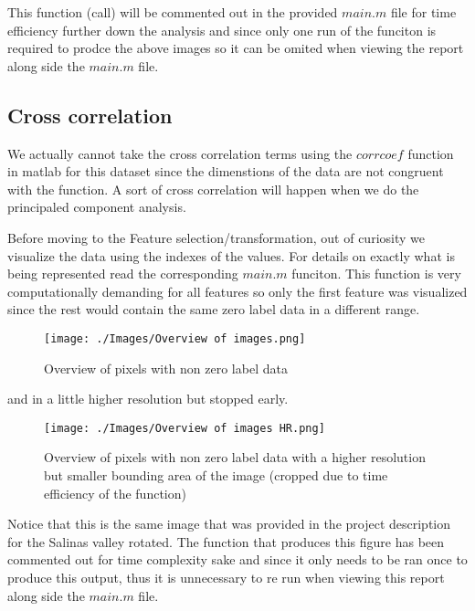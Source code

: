 \documentclass[12pt, a4paper]{article}
\begin{document}
This function (call) will be commented out in the provided $main.m$ file for time efficiency further down the analysis and since only one run of the funciton is required to prodce the above images so it can be omited when viewing the report along side the $main.m$ file.
\newline

\subsection{Cross correlation} \label{cross}

We actually cannot take the cross correlation terms using the $corrcoef$ function in matlab for this dataset since the dimenstions of the data are not congruent with the function. A sort of cross correlation will happen when we do the principaled component analysis.
\newline

Before moving to the Feature selection/transformation, out of curiosity we visualize the data using the indexes of the values. For details on exactly what is being represented read the corresponding $main.m$ funciton. This function is very computationally demanding for all features so only the first feature was visualized since the rest would contain the same zero label data in a different range.
\newline

\begin{figure}[H]
    \begin{center}
        \texttt{[image: ./Images/Overview of images.png]}
    \end{center}
    \caption{Overview of pixels with non zero label data}\label{fig:overview}
\end{figure}

and in a little higher resolution but stopped early.
\newline

\begin{figure}[H]
    \begin{center}
        \texttt{[image: ./Images/Overview of images HR.png]}
    \end{center}
    \caption{Overview of pixels with non zero label data with a higher resolution but smaller bounding area of the image (cropped due to time efficiency of the function)}\label{fig:overview hd}
\end{figure}

Notice that this is the same image that was provided in the project description for the Salinas valley rotated. The function that produces this figure has been commented out for time complexity sake and since it only needs to be ran once to produce this output, thus it is unnecessary to re run when viewing this report along side the $main.m$ file.
\end{document}
